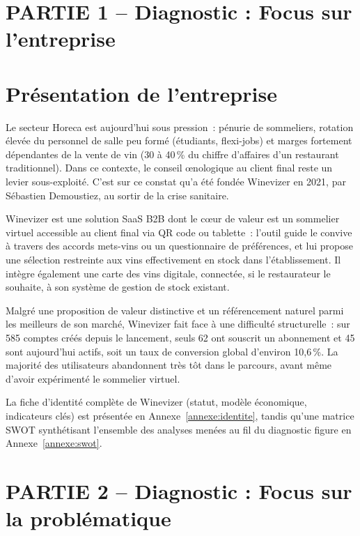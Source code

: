 \documentclass[12pt, a4paper]{article}
\newcounter{annexe}
\begin{document}
\section*{PARTIE 1 – Diagnostic : Focus sur l'entreprise}

\section{Présentation de l'entreprise}

Le secteur Horeca est aujourd'hui sous pression~: pénurie de sommeliers, rotation élevée du personnel
de salle peu formé (étudiants, flexi-jobs) et marges fortement dépendantes de la vente de vin
(30 à 40\,\% du chiffre d'affaires d'un restaurant traditionnel). Dans ce contexte, le conseil œnologique au
client final reste un levier sous-exploité. C'est sur ce constat qu'a été fondée Winevizer en
2021, par Sébastien Demoustiez, au sortir de la crise sanitaire.

Winevizer est une solution SaaS B2B dont le cœur de valeur est un sommelier virtuel accessible
au client final via QR code ou tablette~: l'outil guide le convive à travers des accords mets-vins
ou un questionnaire de préférences, et lui propose une sélection restreinte aux vins effectivement
en stock dans l'établissement. Il intègre également une carte des vins digitale, connectée, si le
restaurateur le souhaite, à son système de gestion de stock existant.

Malgré une proposition de valeur distinctive et un référencement naturel parmi les meilleurs
de son marché, Winevizer fait face à une difficulté structurelle~: sur 585 comptes créés depuis
le lancement, seuls 62 ont souscrit un abonnement et 45 sont aujourd'hui actifs, soit un taux de
conversion global d'environ 10,6\,\%. La majorité des utilisateurs abandonnent très tôt dans le
parcours, avant même d'avoir expérimenté le sommelier virtuel.

La fiche d'identité complète de Winevizer (statut, modèle économique, indicateurs clés) est
présentée en Annexe~\ref{annexe:identite}, tandis qu'une matrice SWOT synthétisant l'ensemble
des analyses menées au fil du diagnostic figure en Annexe~\ref{annexe:swot}.

\section*{PARTIE 2 – Diagnostic : Focus sur la problématique}
\end{document}

